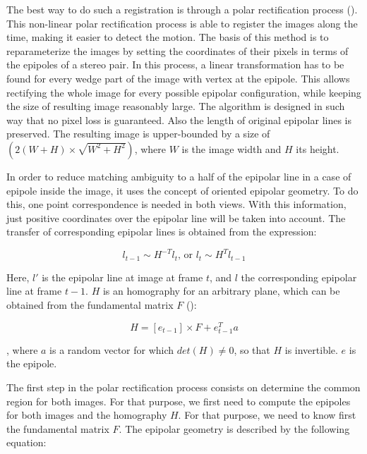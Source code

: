 \begin{framed}

The best way to do such a registration is through a polar rectification process (\cite{pollefeys1999simple}). This non-linear polar rectification process is able to register the images along the time, making it easier to detect the motion. The basis of this method is to reparameterize the images by setting the coordinates of their pixels in terms of the epipoles of a stereo pair. In this process, a linear transformation has to be found for every wedge part of the image with vertex at the epipole. This allows rectifying the whole image for every possible epipolar configuration, while keeping the size of resulting image reasonably large. The algorithm is designed in such way that no pixel loss is guaranteed. Also the length of original epipolar lines is preserved. The resulting image is upper-bounded by a size of $(2 (W + H) \times \sqrt{W^2 + H^2})$, where $W$ is the image width and $H$ its height. 

In order to reduce matching ambiguity to a half of the epipolar line in a case of epipole inside the image, it uses the concept of oriented epipolar geometry. To do this, one point correspondence is needed in both views. With this information, just positive coordinates over the epipolar line will be taken into account. The transfer of corresponding epipolar lines is obtained from the expression:

\begin{equation}\label{eq:cp04_epipolar_lines}
l_{t - 1} \sim H^{-T}l_t\text{, or }l_t \sim H^T l_{t - 1}
\end{equation}

Here, $l'$ is the epipolar line at image at frame $t$, and $l$ the corresponding epipolar line at frame $t - 1$. $H$ is an homography for an arbitrary plane, which can be obtained from the fundamental matrix $F$ (\cite{luong1996fundamental}):

\begin{equation}\label{eq:cp04_homography}
H = [e_{t - 1}] \times F + e_{t - 1}^T a
\end{equation}

, where $a$ is a random vector for which $det(H) \neq 0$, so that $H$ is invertible. $e$ is the epipole.

The first step in the polar rectification process consists on determine the common region for both images. For that purpose, we first need to compute the epipoles for both images and the homography $H$. For that purpose, we need to know first the fundamental matrix $F$. The epipolar geometry is described by the following equation:


\end{framed}
